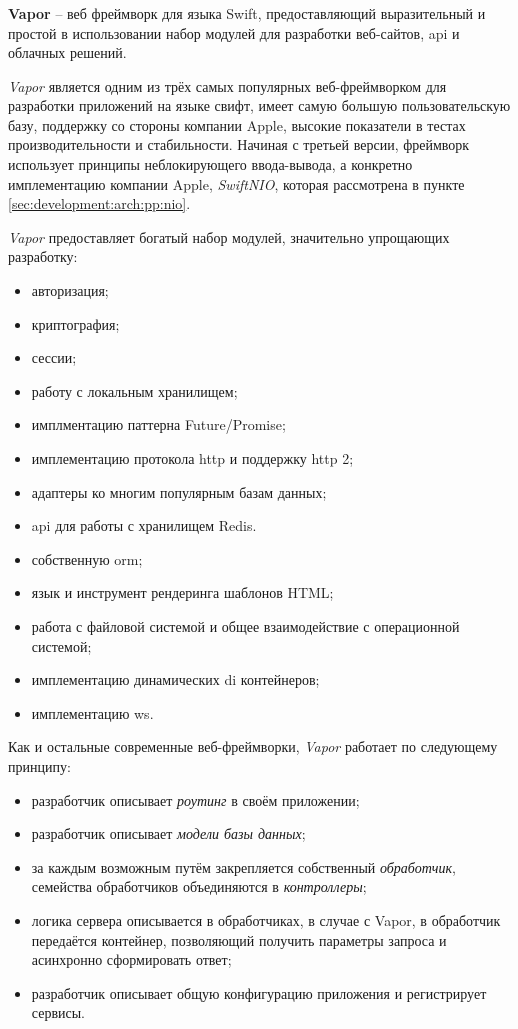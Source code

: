\subsubsection{}
\label{sec:development:arch:pp:vapor}

\textbf{Vapor} -- веб фреймворк для языка Swift, предоставляющий выразительный и простой в использовании набор модулей для разработки веб-сайтов, \gls{api} и облачных решений\cite{vapor:github}.

\textit{Vapor} является одним из трёх самых популярных веб-фреймворком для разработки приложений на языке свифт, имеет самую большую пользовательскую базу, поддержку со стороны компании Apple, высокие показатели в тестах производительности и стабильности. Начиная с третьей версии, фреймворк использует принципы неблокирующего ввода-вывода, а конкретно имплементацию компании Apple, \textit{SwiftNIO}, которая рассмотрена в пункте \ref{sec:development:arch:pp:nio}.

\textit{Vapor} предоставляет богатый набор модулей, значительно упрощающих разработку:

\begin{itemize}
	\item авторизация;
	\item криптография;
	\item сессии;
	\item работу с локальным хранилищем;
	\item имплментацию паттерна Future/Promise;
	\item имплементацию протокола \gls{http} и поддержку \gls{http} 2;
	\item адаптеры ко многим популярным базам данных;
	\item \gls{api} для работы с хранилищем Redis.
	\item собственную \gls{orm};
	\item язык и инструмент рендеринга шаблонов HTML;
	\item работа с файловой системой и общее взаимодействие с операционной системой;
	\item имплементацию динамических \gls{di} контейнеров;
	\item имплементацию \gls{ws}.
\end{itemize}

Как и остальные современные веб-фреймворки, \textit{Vapor} работает по следующему принципу:
\begin{itemize}
	\item разработчик описывает \textit{роутинг} в своём приложении;
	\item разработчик описывает \textit{модели базы данных};
	\item за каждым возможным путём закрепляется собственный \textit{обработчик}, семейства обработчиков объединяются в \textit{контроллеры};
	\item логика сервера описывается в обработчиках, в случае с Vapor, в обработчик передаётся контейнер, позволяющий получить параметры запроса и асинхронно сформировать ответ;
	\item разработчик описывает общую конфигурацию приложения и регистрирует сервисы.
\end{itemize}


